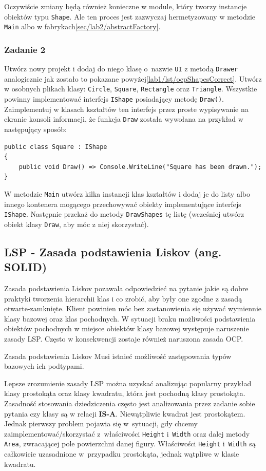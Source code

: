 Oczywiście zmiany będą również konieczne w module, który tworzy instancje obiektów typu \texttt{Shape}. Ale ten proces jest zazwyczaj hermetyzowany w metodzie \texttt{Main} albo w fabrykach\ref{sec/lab2/abstractFactory}.

\subsubsection{Zadanie 2}
Utwórz nowy projekt i dodaj do niego klasę o~nazwie \texttt{UI} z metodą \texttt{Drawer} analogicznie jak zostało to pokazane powyżej\ref{lab1/lst/ocpShapesCorrect}. Utwórz w osobnych plikach klasy: \texttt{Circle}, \texttt{Square}, \texttt{Rectangle} oraz \texttt{Triangle}. Wszystkie powinny implementować interfejs \texttt{IShape} posiadający metodę \texttt{Draw()}. Zaimplementuj w klasach kształtów ten interfejs przez proste wypisywanie na ekranie konsoli informacji, że funkcja \texttt{Draw} została wywołana na przykład w następujący sposób:
\begin{lstlisting}
public class Square : IShape
{
	public void Draw() => Console.WriteLine("Square has been drawn.");
}
\end{lstlisting}
W metodzie \texttt{Main} utwórz kilka instancji klas kształtów i dodaj je do listy albo innego kontenera mogącego przechowywać obiekty implementujące interfejs \texttt{IShape}. Następnie przekaż do metody \texttt{DrawShapes} tę listę (wcześniej utwórz obiekt klasy \texttt{Draw}, aby móc z niej skorzystać).

\subsection{LSP - Zasada podstawienia Liskov (ang. SO\textbf{L}ID)}

Zasada podstawienia Liskov pozawala odpowiedzieć na pytanie jakie są dobre praktyki tworzenia hierarchii klas i co zrobić, aby były one zgodne z zasadą otwarte-zamknięte. Klient powinien móc bez zastanowienia się używać wymiennie klasy bazowej oraz klas pochodnych. W sytuacji braku możliwości podstawienia obiektów pochodnych w miejsce obiektów klasy bazowej występuje naruszenie zasady LSP. Często w konsekwencji zostaje również naruszona zasada OCP.

\begin{myboxWithTitle}{Zasada podstawienia Liskov}
Musi istnieć możliwość zastępowania typów bazowych ich podtypami.
\end{myboxWithTitle}

Lepsze zrozumienie zasady LSP można uzyskać analizując popularny przykład klasy prostokąta oraz klasy kwadratu, która jest pochodną klasy prostokąta. Zasadność stosowania dziedziczenia często jest analizowania przez zadanie sobie pytania czy klasy są w relacji \textbf{IS-A}. Niewątpliwie kwadrat jest prostokątem. Jednak pierwszy problem pojawia się w~sytuacji, gdy chcemy zaimplementować/skorzystać z~właściwości \texttt{Height} i~\texttt{Width} oraz dalej metody \texttt{Area}, zwracającej pole powierzchni danej figury. Właściwości \texttt{Height} i~\texttt{Width} są całkowicie uzasadnione w~przypadku prostokąta, jednak wątpliwe w klasie kwadratu. 

